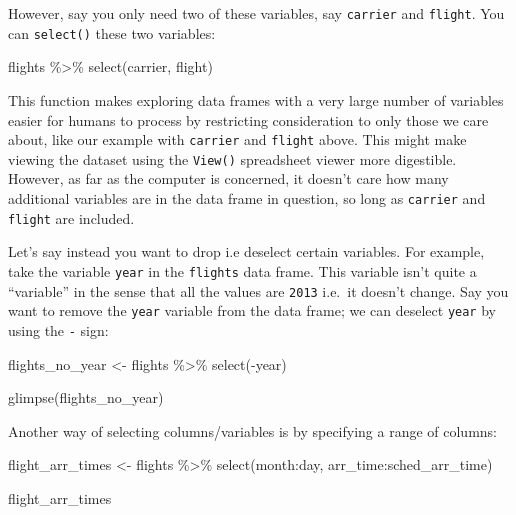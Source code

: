 \documentclass[
  letterpaper,
  DIV=11,
  numbers=noendperiod]{scrreprt}
\newenvironment{Shaded}{\begin{snugshade}}{\end{snugshade}}
\newcommand{\FunctionTok}[1]{\textcolor[rgb]{0.28,0.35,0.67}{#1}}
\newcommand{\NormalTok}[1]{\textcolor[rgb]{0.00,0.23,0.31}{#1}}
\newcommand{\OtherTok}[1]{\textcolor[rgb]{0.00,0.23,0.31}{#1}}
\newcommand{\SpecialCharTok}[1]{\textcolor[rgb]{0.37,0.37,0.37}{#1}}
\theoremstyle{definition}
\theoremstyle{remark}
\begin{document}
However, say you only need two of these variables, say \texttt{carrier}
and \texttt{flight}. You can \texttt{select()} these two variables:

\begin{Shaded}
\begin{Highlighting}[]
\NormalTok{flights }\SpecialCharTok{\%\textgreater{}\%} 
  \FunctionTok{select}\NormalTok{(carrier, flight)}
\end{Highlighting}
\end{Shaded}

This function makes exploring data frames with a very large number of
variables easier for humans to process by restricting consideration to
only those we care about, like our example with \texttt{carrier} and
\texttt{flight} above. This might make viewing the dataset using the
\texttt{View()} spreadsheet viewer more digestible. However, as far as
the computer is concerned, it doesn't care how many additional variables
are in the data frame in question, so long as \texttt{carrier} and
\texttt{flight} are included.

Let's say instead you want to drop i.e deselect certain variables. For
example, take the variable \texttt{year} in the \texttt{flights} data
frame. This variable isn't quite a ``variable'' in the sense that all
the values are \texttt{2013} i.e.~it doesn't change. Say you want to
remove the \texttt{year} variable from the data frame; we can deselect
\texttt{year} by using the \texttt{-} sign:

\begin{Shaded}
\begin{Highlighting}[]
\NormalTok{flights\_no\_year }\OtherTok{\textless{}{-}}\NormalTok{ flights }\SpecialCharTok{\%\textgreater{}\%} 
  \FunctionTok{select}\NormalTok{(}\SpecialCharTok{{-}}\NormalTok{year)}

\FunctionTok{glimpse}\NormalTok{(flights\_no\_year)}
\end{Highlighting}
\end{Shaded}

Another way of selecting columns/variables is by specifying a range of
columns:

\begin{Shaded}
\begin{Highlighting}[]
\NormalTok{flight\_arr\_times }\OtherTok{\textless{}{-}}\NormalTok{ flights }\SpecialCharTok{\%\textgreater{}\%} 
  \FunctionTok{select}\NormalTok{(month}\SpecialCharTok{:}\NormalTok{day, arr\_time}\SpecialCharTok{:}\NormalTok{sched\_arr\_time)}

\NormalTok{flight\_arr\_times}
\end{Highlighting}
\end{Shaded}
\end{document}
